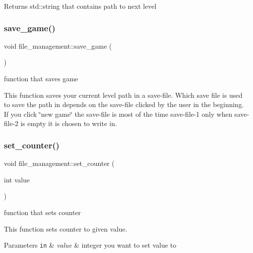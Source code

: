 \begin{DoxyReturn}{Returns}
std\+::string that contains path to next level 
\end{DoxyReturn}
\mbox{\label{classfile__management_a79e6ae7cec63aa959d7d0730d6ffa5a3}} 
\subsubsection{\texorpdfstring{save\+\_\+game()}{save\_game()}}
{\footnotesize\ttfamily void file\+\_\+management\+::save\+\_\+game (\begin{DoxyParamCaption}{ }\end{DoxyParamCaption})}



function that saves game 

This function saves your current level path in a save-\/file. Which save file is used to save the path in depends on the save-\/file clicked by the user in the beginning. If you click \char`\"{}new game\char`\"{} the save-\/file is most of the time save-\/file-\/1 only when save-\/file-\/2 is empty it is chosen to write in. \mbox{\label{classfile__management_a291475384add5bdb8002127c71c568ac}} 
\subsubsection{\texorpdfstring{set\+\_\+counter()}{set\_counter()}}
{\footnotesize\ttfamily void file\+\_\+management\+::set\+\_\+counter (\begin{DoxyParamCaption}\item[{int}]{value }\end{DoxyParamCaption})}



function that sets counter 

This function sets counter to given value.


\begin{DoxyParams}[1]{Parameters}
\mbox{\tt in}  & {\em value} & integer you want to set value to \\
\hline
\end{DoxyParams}
\mbox{\label{classfile__management_a090d9aba4dd5a795428ccbfe8d4037e6}} 
